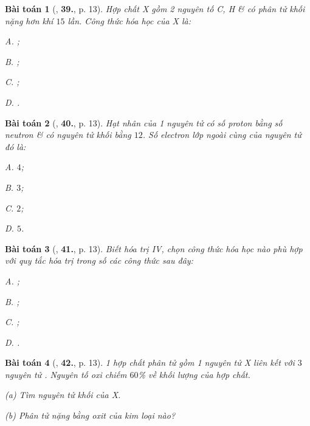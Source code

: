 \documentclass{article}
\numberwithin{equation}{section}
\newtheorem{baitoan}{Bài toán}[section]
\begin{document}
\begin{baitoan}[\cite{An2011}, \textbf{39.}, p. 13]
	Hợp chất X gồm 2 nguyên tố C, H \& có phân tử khối nặng hơn khí  $15$ lần. Công thức hóa học của X là:
	\begin{enumerate*}
		\item[{\rm\sf A.}] ;
		\item[{\rm\sf B.}] ;
		\item[{\rm\sf C.}] ;
		\item[{\rm\sf D.}] .
	\end{enumerate*}
\end{baitoan}

\begin{baitoan}[\cite{An2011}, \textbf{40.}, p. 13]
	Hạt nhân của 1 nguyên tử có số proton bằng số neutron \& có nguyên tử khối bằng $12$. Số electron lớp ngoài cùng của nguyên tử đó là:
	\begin{enumerate*}
		\item[{\rm\sf A.}] $4$;
		\item[{\rm\sf B.}] $3$;
		\item[{\rm\sf C.}] $2$;
		\item[{\rm\sf D.}] $5$.
	\end{enumerate*}
\end{baitoan}

\begin{baitoan}[\cite{An2011}, \textbf{41.}, p. 13]
	Biết  hóa trị IV, chọn công thức hóa học nào phù hợp với quy tắc hóa trị trong số các công thức sau đây:
	\begin{enumerate*}
		\item[{\rm\sf A.}] \ce{SO3};
		\item[{\rm\sf B.}] \ce{SO2};
		\item[{\rm\sf C.}] \ce{S2O3};
		\item[{\rm\sf D.}] \ce{S2O}.
	\end{enumerate*}
\end{baitoan}

\begin{baitoan}[\cite{An2011}, \textbf{42.}, p. 13]
	1 hợp chất phân tử gồm 1 nguyên tử X liên kết với $3$ nguyên tử . Nguyên tố oxi chiếm $60$\% về khối lượng của hợp chất.
	\begin{enumerate*}
		\item[(a)] Tìm nguyên tử khối của X.
		\item[(b)] Phân tử nặng bằng oxit của kim loại nào?
	\end{enumerate*}
\end{baitoan}
\end{document}
